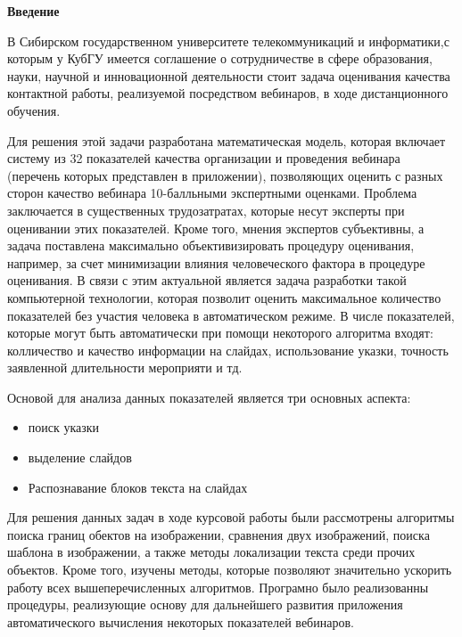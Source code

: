 \documentclass[oneside,final,14pt]{extreport}
\begin{document}
\tableofcontents
\newpage
\begin{center}
\bfseries Введение
\end{center}

	В Сибирском государственном университете телекоммуникаций и информатики,с которым у КубГУ имеется соглашение о сотрудничестве в сфере образования, науки, научной и инновационной деятельности стоит задача оценивания
качества контактной работы, реализуемой посредством вебинаров, в ходе дистанционного обучения. 

Для решения этой задачи разработана математическая модель, которая включает систему из 32 показателей качества организации и проведения вебинара (перечень которых представлен в приложении), позволяющих оценить с разных сторон  качество вебинара 10-балльными экспертными оценками. Проблема заключается в существенных трудозатратах, которые несут эксперты при оценивании этих показателей. Кроме того, мнения экспертов субъективны, а задача поставлена максимально объективизировать процедуру оценивания, например, за счет минимизации влияния человеческого фактора в процедуре оценивания. В связи с этим актуальной является  задача разработки такой компьютерной технологии, которая позволит оценить максимальное количество показателей без участия человека в автоматическом режиме. В числе показателей, которые могут быть автоматически при помощи некоторого алгоритма входят: колличество и качество информации на слайдах, использование указки, точность заявленной длительности мероприяти и тд.

Основой для анализа данных показателей является три основных аспекта:
\begin{itemize}[label= $-$, noitemsep]
\item поиск указки
\item выделение слайдов
\item Распознавание блоков текста на слайдах
\end{itemize}
 
Для решения данных задач в ходе курсовой работы были рассмотрены алгоритмы поиска границ обектов на изображении, сравнения двух изображений, поиска шаблона в изображении, а также методы локализации текста среди прочих объектов. Кроме того, изучены методы, которые позволяют значительно ускорить работу всех вышеперечисленных алгоритмов. Програмно было реализованны процедуры, реализующие основу для дальнейшего развития приложения автоматического вычисления некоторых показателей вебинаров. 
\end{document}
